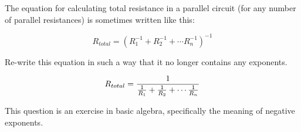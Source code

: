 

The equation for calculating total resistance in a parallel circuit (for any number of parallel resistances) is sometimes written like this:

$$R_{total} = (R_1^{-1} + R_2^{-1} + \cdots R_n^{-1})^{-1}$$

Re-write this equation in such a way that it no longer contains any exponents.







$$R_{total} = {1 \over {{1 \over R_1} + {1 \over R_2} + \cdots {1 \over R_n}}}$$







This question is an exercise in basic algebra, specifically the meaning of negative exponents.





